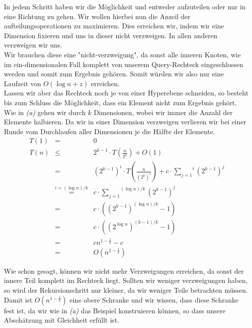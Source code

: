 \documentclass[11pt,a4paper,ngerman]{article}
\begin{document}
    In jedem Schritt haben wir die Möglichkeit und entweder aufzuteilen oder nur in eine Richtung zu gehen.
    Wir wollen hierbei nun die Anzeil der aufteilungsoperationen zu maximieren. Dies erreichen wir,
    indem wir eine Dimension fixieren und uns in dieser nicht verzweigen. In allen anderen verzweigen wir uns.\\

    Wir brauchen diese eine "nicht-verzweigung", da sonst alle inneren Knoten, wie im ein-dimensionalen Fall
    komplett von unserem Query-Rechteck eingeschlossen werden und somit zum Ergebnis gehören. Somit würden
    wir also nur eine Laufzeit von $O(\log n + z)$ erreichen.\\

    Lassen wir aber das Rechteck noch je von einer Hyperebene schneiden, so besteht bis zum Schluss die 
    Möglichkeit, dass ein Element nicht zum Ergebnis gehört.\\

    Wie in \emph{(a)} gehen wir durch $k$ Dimensionen, wobei wir immer die Anzahl der Elemente halbieren.
    Da wir in einer Dimension verzweigen verlieren wir bei einer Runde vom Durchlaufen aller Dimensionen
    je die Hälfte der Elemente.
    $$\begin{array}{rcl}
        T(1) &=& 0\\
        T(n) &\leq& 2^{k-1} \cdot T(\frac{n}{2^{k}}) + O(1)\\
            &=& \left( 2^{k-1} \right)^i \cdot T(\frac{n}{\left( 2^k \right)^i}) + c \cdot \overset{i}{\underset{j=1}{\sum}} \left(2^{k-1}\right)^j\\
            &\stackrel{i=(\log n)/k}{=}& c \cdot \overset{(\log n)/k}{\underset{j=1}{\sum}} \left(2^{k-1} \right)^j\\
            &=& c \cdot \left( \left( 2^{k-1} \right)^{(\log n)/k} - 1\right)\\
            &=& c \cdot \left( \left( 2^{\log n} \right)^{(k-1)/k} - 1 \right)\\
            &=& c n^{1 - \frac{1}{k}} - c\\
            &=& O(n^{1 - \frac{1}{k}})
    \end{array}$$

    Wie schon gesagt, können wir nicht mehr Verzweigungen erreichen, da sonst der innere Teil komplett im Rechteck liegt.
    Sollten wir weniger verzweigungen haben, so wird der Rekursionschritt nur kleiner, da wir weniger Teile betrachten müssen.
    Damit ist $O(n^{1-\frac{1}{k}})$ eine obere Schranke und wir wissen, dass diese Schranke fest ist, da wir wie in \emph{(a)} das
    Beispiel konstruieren können, so dass unsere Abschätzung mit Gleichheit erfüllt ist.
\end{document}
